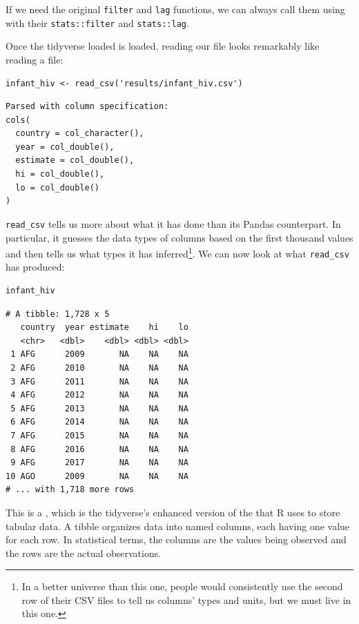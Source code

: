 \noindent
If we need the original \texttt{filter} and \texttt{lag} functions,
we can always call them using with their
\texttt{stats::filter} and \texttt{stats::lag}.

Once the tidyverse loaded is loaded,
reading our file looks remarkably like reading a file:

\begin{lstlisting}
infant_hiv <- read_csv('results/infant_hiv.csv')
\end{lstlisting}

\begin{lstlisting}
Parsed with column specification:
cols(
  country = col_character(),
  year = col_double(),
  estimate = col_double(),
  hi = col_double(),
  lo = col_double()
)
\end{lstlisting}

\texttt{read\_csv} tells us more about what it has done than its Pandas counterpart.
In particular,
it guesses the data types of columns based on the first thousand values
and then tells us what types it has inferred\footnote{In a better universe than this one,
people would consistently use the second row of their CSV files to tell us columns' types and units,
but we must live in this one.}.
We can now look at what \texttt{read\_csv} has produced:

\begin{lstlisting}
infant_hiv
\end{lstlisting}

\begin{lstlisting}
# A tibble: 1,728 x 5
   country  year estimate    hi    lo
   <chr>   <dbl>    <dbl> <dbl> <dbl>
 1 AFG      2009       NA    NA    NA
 2 AFG      2010       NA    NA    NA
 3 AFG      2011       NA    NA    NA
 4 AFG      2012       NA    NA    NA
 5 AFG      2013       NA    NA    NA
 6 AFG      2014       NA    NA    NA
 7 AFG      2015       NA    NA    NA
 8 AFG      2016       NA    NA    NA
 9 AFG      2017       NA    NA    NA
10 AGO      2009       NA    NA    NA
# ... with 1,718 more rows
\end{lstlisting}

\noindent
This is a ,
which is the tidyverse's enhanced version of the 
that R uses to store tabular data.
A tibble organizes data into named columns,
each having one value for each row.
In statistical terms,
the columns are the values being observed
and the rows are the actual observations.

